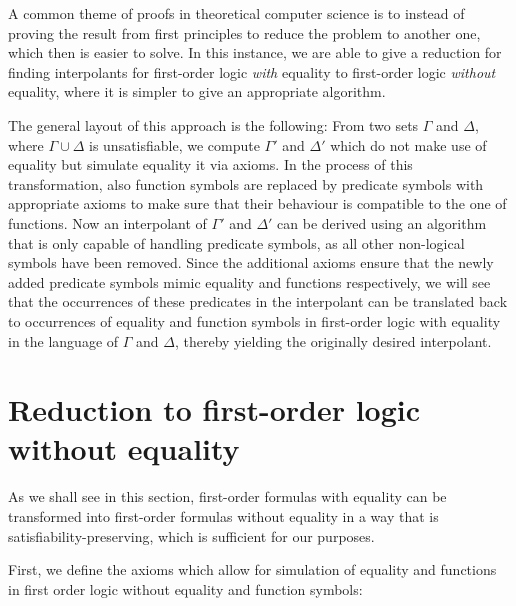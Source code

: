 
A common theme of proofs in theoretical computer science is to instead of proving the result from first principles to reduce the problem to another one, which then is easier to solve.
In this instance, we are able to give a reduction for finding interpolants for first-order logic \emph{with} equality to first-order logic \emph{without} equality, where it is simpler to give an appropriate algorithm.

The general layout of this approach is the following:
From two sets $\Gamma$ and $\Delta$, where $\Gamma \cup \Delta$ is unsatisfiable, we compute $\Gamma'$ and $\Delta'$ which do not make use of equality but simulate equality it via axioms.
In the process of this transformation, also function symbols are replaced by predicate symbols with appropriate axioms to make sure that their behaviour is compatible to the one of functions.
Now an interpolant of $\Gamma'$ and $\Delta'$ can be derived using an algorithm that is only capable of handling predicate symbols, as all other non-logical symbols have been removed.
Since the additional axioms ensure that the newly added predicate symbols mimic equality and functions respectively, we will see that the occurrences of these predicates in the interpolant can be translated back to occurrences of equality and function symbols in first-order logic with equality in the language of $\Gamma$ and $\Delta$, thereby yielding the originally desired interpolant.


\section{Reduction to first-order logic without equality}

As we shall see in this section, first-order formulas with equality can be transformed into first-order formulas without equality in a way that is satisfiability-preserving, which is sufficient for our purposes.

First, we define the axioms which allow for simulation of equality and functions in first order logic without equality and function symbols:

